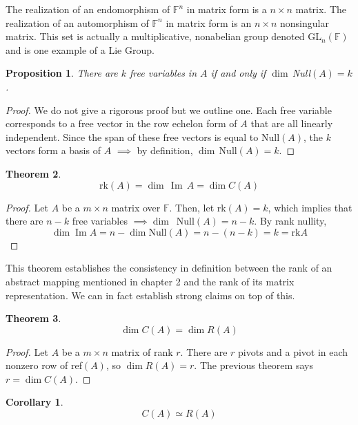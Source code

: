 \documentclass{article}
\DeclareMathOperator{\im}{Im}
\newtheorem{theorem}{Theorem}[section]
\newtheorem{proposition}[theorem]{Proposition}
\newtheorem{corollary}{Corollary}[theorem]
\theoremstyle{remark}
\theoremstyle{definition}
\begin{document}
The realization of an endomorphism of $\mathbb{F}^n$ in matrix form is a $n \times n$ matrix. The realization of an automorphism of $\mathbb{F}^n$ in matrix form is an $n \times n$ nonsingular matrix. This set is actually a multiplicative, nonabelian group denoted GL$_n(\mathbb{F})$ and is one example of a Lie Group. 

\begin{proposition}
There are $k$ free variables in $A$ if and only if $\dim\,$Null$(A) = k$. 
\end{proposition}
\begin{proof}
We do not give a rigorous proof but we outline one. Each free variable corresponds to a free vector in the row echelon form of $A$ that are all linearly independent. Since the span of these free vectors is equal to Null$(A)$, the $k$ vectors form a basis of $A$ $\implies$ by definition, $\dim\,$Null$(A) = k$.
\end{proof}

\begin{theorem}
\[\text{rk}(A) = \dim \, \im \,A = \dim C(A)\]
\end{theorem}

\begin{proof}
Let $A$ be a $m \times n$ matrix over $\mathbb{F}$. Then, let rk$(A) = k$, which implies that there are $n-k$ free variables $\implies \dim \,$ Null$(A) = n - k$. By rank nullity, 
\[\dim \im{A} = n - \dim \text{Null}(A) = n - (n -k) = k = \text{rk} A \]
\end{proof}

This theorem establishes the consistency in definition between the rank of an abstract mapping mentioned in chapter 2 and the rank of its matrix representation. We can in fact establish strong claims on top of this. 

\begin{theorem} 
\[\dim C(A) = \dim R(A)\]
\end{theorem}

\begin{proof}
Let $A$ be a $m \times n$ matrix of rank $r$. There are $r$ pivots and a pivot in each nonzero row of ref$(A)$, so $\dim R(A) = r$. The previous theorem says $r = \dim C(A)$. 
\end{proof}

\begin{corollary}
\[C(A) \simeq R(A)\]
\end{corollary}
\end{document}
